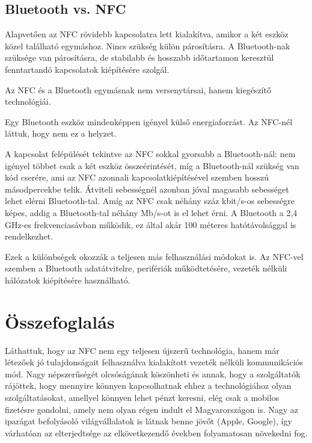 \documentclass[12pt]{article}
\begin{document}
\subsection{Bluetooth vs. NFC}
Alapvetően az NFC rövidebb kapcsolatra lett kialakítva, amikor a két eszköz közel 
található egymáshoz. Nincs szükség külön párosításra. A Bluetooth-nak szüksége 
van párosításra, de stabilabb és hosszabb időtartamon keresztül fenntartandó
kapcsolatok kiépítésére szolgál.

Az NFC és a Bluetooth egymásnak nem versenytársai, hanem kiegészítő technológiái.

Egy Bluetooth eszköz mindenképpen igényel külső energiaforrást. Az NFC-nél láttuk, 
hogy nem ez a helyzet.

A kapcsolat felépülését tekintve az NFC sokkal gyorsabb a Bluetooth-nál: nem igényel
többet csak a két eszköz összeérintését, míg a Bluetooth-nál szükség van kód
cserére, ami az NFC azonnali kapcsolatkiépítésével szemben hosszú másodpercekbe
telik. Átviteli sebességnél azonban jóval magasabb sebességet lehet elérni
Bluetooth-tal. Amíg az NFC csak néhány száz kbit/s-os sebességre képes, addig
a Bluetooth-tal néhány Mb/s-ot is el lehet érni. A Bluetooth a 2,4 GHz-es 
frekvenciasávban működik, ez által akár 100 méteres hatótávolsággal is 
rendelkezhet.

Ezek a különbségek okozzák a teljesen más felhasználási módokat is. Az NFC-vel 
szemben a Bluetooth adatátvitelre, perifériák működtetésére, vezeték nélküli 
hálózatok kiépítésére használható.

\section{Összefoglalás}
Láthattuk, hogy az NFC nem egy teljesen újszerű technológia, hanem már létezőek jó
tulajdonságait felhasználva kialakított vezeték nélküli kommunikációs mód.
Nagy népszerűségét olcsóságának köszönheti és annak, hogy a szolgáltatók 
rájöttek, hogy mennyire könnyen kapcsolhatnak ehhez a technológiához olyan
szolgáltatásokat, amellyel könnyen lehet pénzt keresni, elég csak a mobilos
fizetésre gondolni, amely nem olyan régen indult el Magyarországon is.
Nagy az iparágat befolyásoló világvállalatok is látnak benne jövőt (Apple, Google),
így várhatóan az elterjedtsége az elkövetkezendő években folyamatosan növekedni fog.
\end{document}
